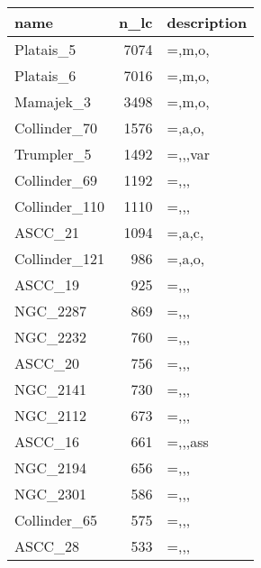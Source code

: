 \begin{tabular}{lrl}
\toprule
          name &  n\_lc & description \\
\midrule
     Platais\_5 &  7074 &      =,m,o, \\
     Platais\_6 &  7016 &      =,m,o, \\
     Mamajek\_3 &  3498 &      =,m,o, \\
  Collinder\_70 &  1576 &      =,a,o, \\
    Trumpler\_5 &  1492 &     =,,,var \\
  Collinder\_69 &  1192 &        =,,, \\
 Collinder\_110 &  1110 &        =,,, \\
       ASCC\_21 &  1094 &      =,a,c, \\
 Collinder\_121 &   986 &      =,a,o, \\
       ASCC\_19 &   925 &        =,,, \\
      NGC\_2287 &   869 &        =,,, \\
      NGC\_2232 &   760 &        =,,, \\
       ASCC\_20 &   756 &        =,,, \\
      NGC\_2141 &   730 &        =,,, \\
      NGC\_2112 &   673 &        =,,, \\
       ASCC\_16 &   661 &     =,,,ass \\
      NGC\_2194 &   656 &        =,,, \\
      NGC\_2301 &   586 &        =,,, \\
  Collinder\_65 &   575 &        =,,, \\
       ASCC\_28 &   533 &        =,,, \\
\bottomrule
\end{tabular}
